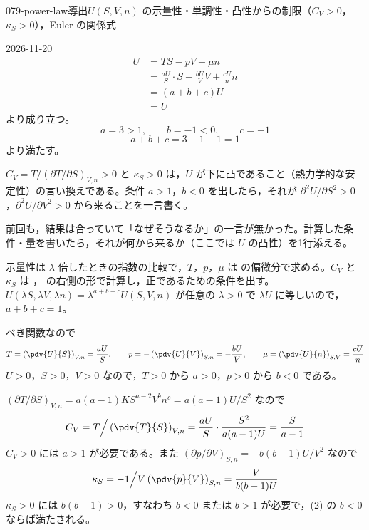\documentclass[uplatex,dvipdfmx,a4paper,11pt]{jsarticle}
\begin{document}
\begin{mondai}{079-power-law}{導出}{$U(S,V,n)$ の示量性・単調性・凸性からの制限（$C_{V}>0$，$\kappa_{S}>0$），Euler の関係式}
\begin{kotaeutsushi}{2026-11-20}
\begin{align*}
U&=TS-pV+\mu n\\
&=\frac{aU}{S}\cdot S+\frac{bU}{V}V+\frac{cU}{n}n\\
&=(a+b+c)U\\
&=U
\end{align*}
より成り立つ。
\[ a=3>1, \qquad b=-1<0, \qquad c=-1 \]
\[ a+b+c=3-1-1=1 \]
より満たす。
\end{kotaeutsushi}
\begin{kizuki}
\item $C_{V}=T/(\partial T/\partial S)_{V,n}>0$ と $\kappa_{S}>0$ は，$U$ が下に凸であること（熱力学的な安定性）の言い換えである。条件 $a>1$，$b<0$ を出したら，それが $\partial^{2}U/\partial S^{2}>0$，$\partial^{2}U/\partial V^{2}>0$ から来ることを一言書く。
\item {} 前回も，結果は合っていて「なぜそうなるか」の一言が無かった。計算した条件・量を書いたら，それが何から来るか（ここでは $U$ の凸性）を1行添える。
\end{kizuki}
\begin{tadashii}
\houshin 示量性は $\lambda$ 倍したときの指数の比較で，$T$，$p$，$\mu$ は  の偏微分で求める。$C_{V}$ と $\kappa_{S}$ は ， の右側の形で計算し，正であるための条件を出す。
\keisan {} $U(\lambda S,\lambda V,\lambda n) = \lambda^{a+b+c}U(S,V,n)$ が任意の $\lambda > 0$ で $\lambda U$ に等しいので，$a + b + c = 1$。

 べき関数なので
\[ T = \left(\pdv{U}{S}\right)_{V,n} = \frac{aU}{S}, \qquad p = -\left(\pdv{U}{V}\right)_{S,n} = -\frac{bU}{V}, \qquad \mu = \left(\pdv{U}{n}\right)_{S,V} = \frac{cU}{n} \]
$U > 0$，$S > 0$，$V > 0$ なので，$T > 0$ から $a > 0$，$p > 0$ から $b < 0$ である。

 $(\partial T/\partial S)_{V,n} = a(a-1)KS^{a-2}V^{b}n^{c} = a(a-1)U/S^{2}$ なので
\[ C_{V} = T\Big/\left(\pdv{T}{S}\right)_{V,n} = \frac{aU}{S}\cdot\frac{S^{2}}{a(a-1)U} = \frac{S}{a-1} \]
$C_{V} > 0$ には $a > 1$ が必要である。また $(\partial p/\partial V)_{S,n} = -b(b-1)U/V^{2}$ なので
\[ \kappa_{S} = -1\Big/V\left(\pdv{p}{V}\right)_{S,n} = \frac{V}{b(b-1)U} \]
$\kappa_{S} > 0$ には $b(b-1) > 0$，すなわち $b < 0$ または $b > 1$ が必要で，(2) の $b < 0$ ならば満たされる。


\end{tadashii}
\end{mondai}
\end{document}
